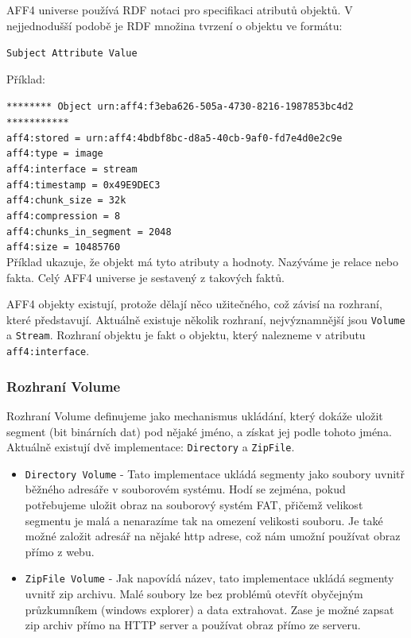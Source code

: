 \noindent AFF4 universe používá RDF notaci pro specifikaci atributů objektů. V nejjednodušší podobě je RDF množina tvrzení o objektu ve formátu:

\texttt{Subject   Attribute   Value}

\vspace{0.5cm}

\noindent Příklad:

\noindent \texttt{******** Object urn:aff4:f3eba626-505a-4730-8216-1987853bc4d2 ***********}\\
\texttt{aff4:stored = urn:aff4:4bdbf8bc-d8a5-40cb-9af0-fd7e4d0e2c9e}\\
\texttt{aff4:type = image}\\
\texttt{aff4:interface = stream}\\
\texttt{aff4:timestamp = 0x49E9DEC3}\\
\texttt{aff4:chunk\_size = 32k}\\
\texttt{aff4:compression = 8}\\
\texttt{aff4:chunks\_in\_segment = 2048}\\
\texttt{aff4:size = 10485760}\\

\noindent Příklad ukazuje, že objekt má tyto atributy a hodnoty. Nazýváme je relace nebo fakta. Celý AFF4 universe je sestavený z takových faktů.

\noindent AFF4 objekty existují, protože dělají něco užitečného, což závisí na rozhraní, které představují. Aktuálně existuje několik rozhraní, nejvýznamnější jsou \texttt{Volume} a \texttt{Stream}. Rozhraní objektu je fakt o objektu, který nalezneme v atributu \texttt{aff4:interface}.

\subsubsection{Rozhraní Volume}
Rozhraní Volume definujeme jako mechanismus ukládání, který dokáže uložit segment (bit binárních dat) pod nějaké jméno, a získat jej podle tohoto jména. Aktuálně existují dvě implementace: \texttt{Directory} a \texttt{ZipFile}.

\begin{itemize}
\item \texttt{Directory Volume} - Tato implementace ukládá segmenty jako soubory uvnitř běžného adresáře v souborovém systému. Hodí se zejména, pokud potřebujeme uložit obraz na souborový systém FAT, přičemž velikost segmentu je malá a nenarazíme tak na omezení velikosti souboru. Je také možné založit adresář na nějaké http adrese, což nám umožní používat obraz přímo z webu.

\item \texttt{ZipFile Volume} - Jak napovídá název, tato implementace ukládá segmenty uvnitř zip archivu. Malé soubory lze bez problémů otevřít obyčejným průzkumníkem (windows explorer) a data extrahovat. Zase je možné zapsat zip archiv přímo na HTTP server a používat obraz přímo ze serveru.
\end{itemize}

